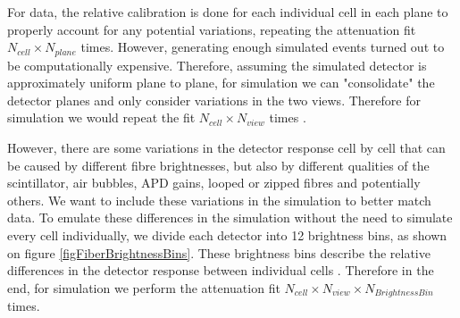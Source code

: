 \documentclass[12pt,a4paper]{article}
\begin{document}
For data, the relative calibration is done for each individual cell in each plane to properly account for any potential variations, repeating the attenuation fit $N_{cell}\times N_{plane}$ times. However, generating enough simulated events turned out to be computationally expensive. Therefore, assuming the simulated detector is approximately uniform plane to plane, for simulation we can "consolidate" the detector planes and only consider variations in the two views. Therefore for simulation we would repeat the fit $N_{cell}\times N_{view}$ times \cite{NOVA-doc-13579-SAAttenuationAndThreshold,NOVA-doc-34909}.

However, there are some variations in the detector response cell by cell that can be caused by different fibre brightnesses, but also by different qualities of the scintillator, air bubbles, APD gains, looped or zipped fibres and potentially others. We want to include these variations in the simulation to better match data. To emulate these differences in the simulation without the need to simulate every cell individually, we divide each detector into 12 brightness bins, as shown on figure \ref{figFiberBrightnessBins}. These brightness bins describe the relative differences in the detector response between individual cells \cite{NOVA-doc-34909}. Therefore in the end, for simulation we perform the attenuation fit $N_{cell}\times N_{view}\times N_{BrightnessBin}$ times.

\end{document}
